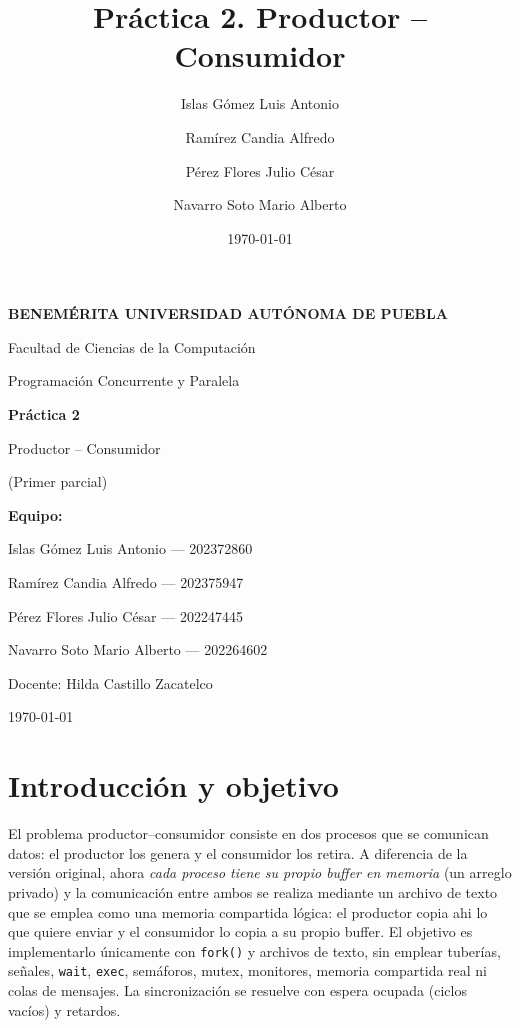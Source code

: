 \documentclass[12pt,letterpaper]{article}
\title{Pr\'actica 2. Productor -- Consumidor}
\author{Islas G\'omez Luis Antonio \and Ram\'irez Candia Alfredo \and P\'erez Flores Julio C\'esar \and Navarro Soto Mario Alberto}
\date{\today}
\begin{document}
\begin{titlepage}
    \centering
    \vspace*{0.5cm}

    {\Large\bfseries BENEM\'ERITA UNIVERSIDAD AUT\'ONOMA DE PUEBLA\par}
    \vspace{0.4cm}
    {\large Facultad de Ciencias de la Computaci\'on\par}
    \vspace{1.2cm}

    {\large Programaci\'on Concurrente y Paralela\par}

    \vfill

    {\Huge\bfseries Pr\'actica 2\par}
    \vspace{0.4cm}
    {\LARGE Productor -- Consumidor\par}
    \vspace{0.3cm}
    {\large (Primer parcial)\par}

    \vfill

    {\large\bfseries Equipo:\par}
    \vspace{0.3cm}
    Islas G\'omez Luis Antonio --- 202372860\par
    Ram\'irez Candia Alfredo --- 202375947\par
    P\'erez Flores Julio C\'esar --- 202247445\par
    Navarro Soto Mario Alberto --- 202264602\par

    \vfill

    {\large Docente: Hilda Castillo Zacatelco\par}
    \vspace{0.6cm}
    {\large \today\par}
\end{titlepage}

\tableofcontents
\newpage

\section{Introducci\'on y objetivo}
El problema productor--consumidor consiste en dos procesos que se comunican
datos: el productor los genera y el consumidor los retira. A diferencia de la
versi\'on original, ahora \emph{cada proceso tiene su propio buffer en memoria}
(un arreglo privado) y la comunicaci\'on entre ambos se realiza mediante un
archivo de texto que se emplea como una memoria compartida l\'ogica: el
productor copia ahi lo que quiere enviar y el consumidor lo copia a su propio
buffer. El objetivo es implementarlo \'unicamente con \texttt{fork()} y
archivos de texto, sin emplear tuber\'ias, se\~nales, \texttt{wait},
\texttt{exec}, sem\'aforos, mutex, monitores, memoria compartida real ni colas
de mensajes. La sincronizaci\'on se resuelve con espera ocupada (ciclos
vac\'ios) y retardos.
\end{document}
